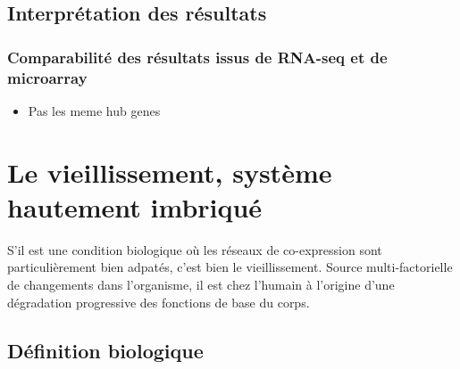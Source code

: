 \subsection{Interprétation des résultats}

\subsubsection{Comparabilité des résultats issus de RNA-seq et de microarray}
\begin{itemize}
    \item Pas les meme hub genes %
\end{itemize}




\section{Le vieillissement, système hautement imbriqué}
S'il est une condition biologique où les réseaux de co-expression sont particulièrement bien adpatés, c'est bien le vieillissement. Source multi-factorielle de changements dans l'organisme, il est chez l'humain à l'origine d'une dégradation progressive des fonctions de base du corps.



\subsection{Définition biologique}





